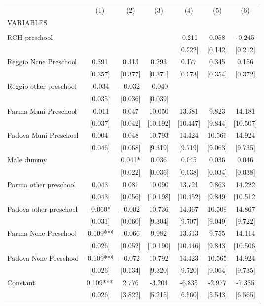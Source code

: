 \begin{tabular}{lcccccc} \hline
 & (1) & (2) & (3) & (4) & (5) & (6) \\
VARIABLES &  &  &  &  &  &  \\ \hline
 &  &  &  &  &  &  \\
RCH preschool &  &  &  & -0.211 & 0.058 & -0.245 \\
 &  &  &  & [0.222] & [0.142] & [0.212] \\
Reggio None Preschool & 0.391 & 0.313 & 0.293 & 0.177 & 0.345 & 0.156 \\
 & [0.357] & [0.377] & [0.371] & [0.373] & [0.354] & [0.372] \\
Reggio other preschool & -0.034 & -0.032 & -0.040 &  &  &  \\
 & [0.035] & [0.036] & [0.039] &  &  &  \\
Parma Muni Preschool & -0.011 & 0.047 & 10.050 & 13.681 & 9.823 & 14.181 \\
 & [0.037] & [0.042] & [10.192] & [10.447] & [9.844] & [10.507] \\
Padova Muni Preschool & 0.004 & 0.048 & 10.793 & 14.424 & 10.566 & 14.924 \\
 & [0.046] & [0.068] & [9.319] & [9.719] & [9.063] & [9.735] \\
Male dummy &  & 0.041* & 0.036 & 0.045 & 0.036 & 0.046 \\
 &  & [0.022] & [0.036] & [0.038] & [0.034] & [0.038] \\
Parma other preschool & 0.043 & 0.081 & 10.090 & 13.721 & 9.863 & 14.222 \\
 & [0.043] & [0.056] & [10.198] & [10.452] & [9.849] & [10.512] \\
Padova other preschool & -0.060* & -0.002 & 10.736 & 14.367 & 10.509 & 14.867 \\
 & [0.031] & [0.060] & [9.304] & [9.707] & [9.049] & [9.722] \\
Parma None Preschool & -0.109*** & -0.066 & 9.982 & 13.613 & 9.755 & 14.114 \\
 & [0.026] & [0.052] & [10.190] & [10.446] & [9.843] & [10.506] \\
Padova None Preschool & -0.109*** & -0.072 & 10.792 & 14.423 & 10.565 & 14.924 \\
 & [0.026] & [0.134] & [9.320] & [9.720] & [9.064] & [9.735] \\
Constant & 0.109*** & 2.776 & -3.204 & -6.835 & -2.977 & -7.335 \\
 & [0.026] & [3.822] & [5.215] & [6.560] & [5.543] & [6.565] \\

\end{tabular}
